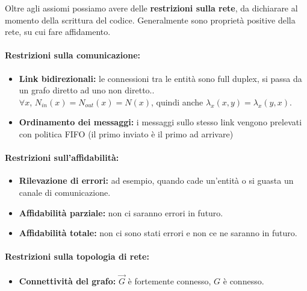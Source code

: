 \newpage

Oltre agli assiomi possiamo avere delle \textbf{restrizioni sulla rete}, da dichiarare al momento della scrittura del codice. Generalmente sono proprietà positive della rete, su cui fare affidamento.\\

\paragraph{Restrizioni sulla comunicazione:} 
\begin{itemize}
	\item \textbf{Link bidirezionali:} le connessioni tra le entità sono full duplex, si passa da un grafo diretto ad uno non diretto..\\
	$\forall x$, $N_{in} (x) = N_{out} (x) = N(x)$, quindi anche $\lambda_x (x, y) = \lambda_x (y, x)$.\\
	
	\item \textbf{Ordinamento dei messaggi:} i messaggi sullo stesso link vengono prelevati con politica FIFO (il primo inviato è il primo ad arrivare)
\end{itemize}

\paragraph{Restrizioni sull'affidabilità: }
\begin{itemize}
	\item \textbf{Rilevazione di errori:} ad esempio, quando cade un'entità o si guasta un canale di comunicazione.\\
	
	\item \textbf{Affidabilità parziale:} non ci saranno errori in futuro.\\
	
	\item \textbf{Affidabilità totale:} non ci sono stati errori e non ce ne saranno in futuro.\\
\end{itemize}

\paragraph{Restrizioni sulla topologia di rete: }
\begin{itemize}
	\item \textbf{Connettività del grafo:} $\vec G$ è fortemente connesso, $G$ è connesso.\\
\end{itemize}

